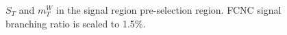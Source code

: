 \begin{figure}[h!]
\caption{$S_T$ and $m_T^W$ in the signal region pre-selection region.  FCNC signal branching ratio is scaled to 1.5\%.}
\label{fig:PreSelPlotsST}
\end{figure}

